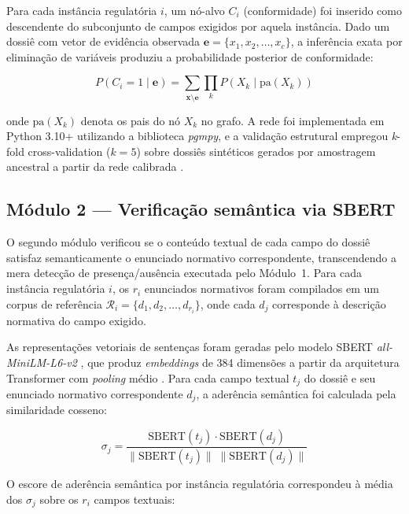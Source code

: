 \documentclass[preprint,12pt,authoryear]{elsarticle}
\begin{document}
Para cada instância regulatória $i$, um nó-alvo $C_i$ (conformidade) foi inserido como descendente do subconjunto de campos exigidos por aquela instância. Dado um dossiê com vetor de evidência observada $\mathbf{e} = \{x_1, x_2, \ldots, x_c\}$, a inferência exata por eliminação de variáveis produziu a probabilidade posterior de conformidade:

\begin{equation}
P(C_i = 1 \mid \mathbf{e}) = \sum_{\mathbf{x} \setminus \mathbf{e}} \prod_{k} P(X_k \mid \text{pa}(X_k))
\label{eq:bayesconf_cap5}
\end{equation}

\noindent onde $\text{pa}(X_k)$ denota os pais do nó $X_k$ no grafo. A rede foi implementada em Python 3.10+ utilizando a biblioteca \textit{pgmpy}, e a validação estrutural empregou \textit{k}-fold cross-validation ($k = 5$) sobre dossiês sintéticos gerados por amostragem ancestral a partir da rede calibrada \citep{Pearl2009}.

\subsection{Módulo 2 --- Verificação semântica via SBERT}
\label{subsec:sbert_cap5}

O segundo módulo verificou se o conteúdo textual de cada campo do dossiê satisfaz semanticamente o enunciado normativo correspondente, transcendendo a mera detecção de presença/ausência executada pelo Módulo~1. Para cada instância regulatória $i$, os $r_i$ enunciados normativos foram compilados em um corpus de referência $\mathcal{R}_i = \{d_1, d_2, \ldots, d_{r_i}\}$, onde cada $d_j$ corresponde à descrição normativa do campo exigido.

As representações vetoriais de sentenças foram geradas pelo modelo SBERT \textit{all-MiniLM-L6-v2} \citep{Reimers2019}, que produz \textit{embeddings} de 384 dimensões a partir da arquitetura Transformer com \textit{pooling} médio \citep{Devlin2019}. Para cada campo textual $t_j$ do dossiê e seu enunciado normativo correspondente $d_j$, a aderência semântica foi calculada pela similaridade cosseno:

\begin{equation}
\sigma_j = \frac{\text{SBERT}(t_j) \cdot \text{SBERT}(d_j)}{\|\text{SBERT}(t_j)\| \; \|\text{SBERT}(d_j)\|}
\label{eq:cosseno_cap5}
\end{equation}

O escore de aderência semântica por instância regulatória correspondeu à média dos $\sigma_j$ sobre os $r_i$ campos textuais:
\end{document}

